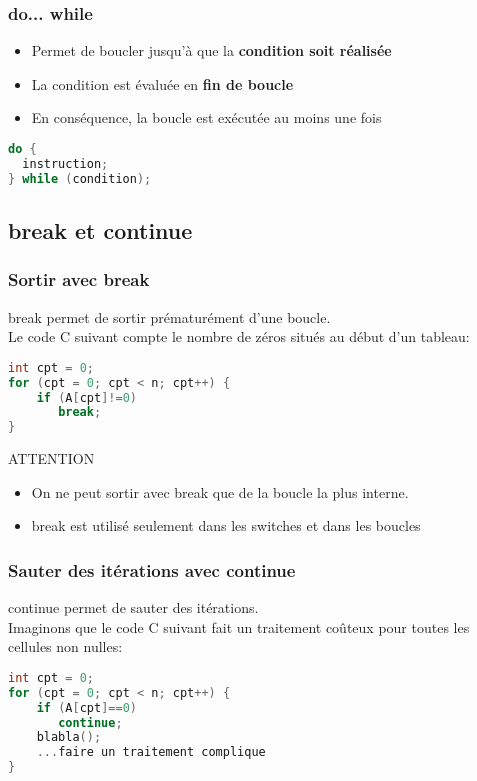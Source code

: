 \documentclass{beamer}
\begin{document}
\begin{frame}[fragile=singleslide,shrink=20]
\frametitle {do... while}
\begin{itemize}
\item{Permet de boucler jusqu'à que la \textbf{condition soit réalisée}}
\item{La condition est évaluée en \textbf{fin de boucle}}
\item{En conséquence, la boucle est exécutée au moins une fois}
\end{itemize}
\begin{lstlisting}[language=c++]
do {
  instruction;
} while (condition);
\end{lstlisting}
\end{frame}

\subsection{break et continue}

\begin{frame}[fragile=singleslide,shrink=20]
\frametitle {Sortir avec break}
break permet de sortir prématurément d'une boucle. \\
Le code C suivant compte le nombre de zéros situés au début d'un tableau:
\begin{lstlisting}[language=c++]
int cpt = 0;
for (cpt = 0; cpt < n; cpt++) {
    if (A[cpt]!=0)
       break;
}
\end{lstlisting}

\begin{block}{ATTENTION}
\begin{itemize}
\item{On ne peut sortir avec break que de la boucle la plus interne.}
\item{break est utilisé seulement dans les switches et dans les boucles}
\end{itemize}
\end{block}
\end{frame}

\begin{frame}[fragile=singleslide,shrink=20]
\frametitle {Sauter des itérations avec continue}
continue permet de sauter des itérations. \\
Imaginons que le code C suivant fait un traitement coûteux pour toutes les cellules non nulles:
\begin{lstlisting}[language=c++]
int cpt = 0;
for (cpt = 0; cpt < n; cpt++) {
    if (A[cpt]==0)
       continue;
    blabla();
    ...faire un traitement complique
}
\end{lstlisting}
\end{frame}
\end{document}
